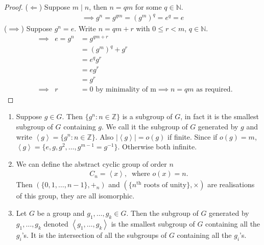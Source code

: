 \begin{proof} \mbox{}
(\(\Longleftarrow\)) Suppose \(m \mid n\), then \(n = qm\) for some \(q \in \mathbb{N}\).
\begin{align*}
    \implies g^n = g^{qm} = (g^m)^q = e^q = e
\end{align*}
(\(\implies\)) Suppose \(g^n = e\). Write \(n = qm + r\) with \(0 \leq r < m\), \(q \in \mathbb{N}\).
\begin{align*}
    &\implies & e = g^n &= g^{qm + r} \\
    && &= (g^m)^q + g^r \\
    && &= e^q g^r \\
    && &= e g^r \\
    && &= g^r \\
    &\implies & r &= 0 \text{ by minimality of m} \implies n = qm \text{ as required.} 
\end{align*}
\end{proof}

\begin{remark} \mbox{}
\begin{enumerate}
\def\labelenumi{\roman{enumi}.}
\item
  Suppose \(g \in G\). Then \(\{ g^n : n \in \mathbb{Z} \}\) is a subgroup of \(G\), in fact it is the smallest subgroup of \(G\) containing \(g\).
  We call it the subgroup of \(G\) generated by \(g\) and write \(\left\langle g \right\rangle = \{ g^n : n \in \mathbb{Z} \}\). Also \(|\left\langle g \right\rangle| = o(g)\) if finite.
  Since if \(o(g) = m\), \(\left\langle g \right\rangle = \{ e, g, g^2, \ldots, g^{m-1} = g^{-1 }\}\).
  Otherwise both infinite.
\item
  We can define the abstract cyclic group of order \(n\)
  \begin{align*}
  C_n = \left\langle x \right\rangle,\ \text{ where } o(x) = n.
  \end{align*}
  Then \(( \{ 0, 1, \ldots, n-1 \}, +_n)\) and \(( \{ n^{\text{th}} \text{ roots of unity}\}, \times)\) are realisations of this group, they are all isomorphic.
\item
  Let \(G\) be a group and \(g_1, \ldots, g_k \in G\). Then the subgroup of \(G\) generated by \(g_1, \ldots, g_k\) denoted \(\left\langle g_1, \ldots, g_k \right\rangle\) is the smallest subgroup of \(G\) containing all the \(g_i\)'s. It is the intersection of all the subgroups of \(G\) containing all the \(g_i\)'s.
\end{enumerate}

\end{remark}